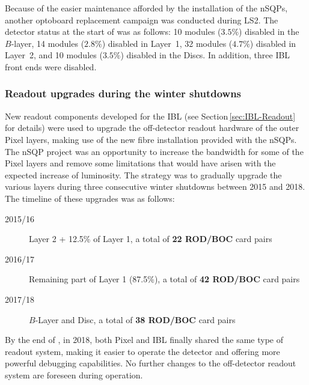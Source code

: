 \documentclass[cernpreprint, atlasdraft=false, UKenglish,british,orcidlogo, texmf, orcidlogo]{atlasdoc}
\begin{document}
Because of the easier maintenance afforded by the installation of the \glspl{nSQP}, another optoboard replacement campaign was conducted during \gls{LS2}. The detector status at the start of \RunThr was as follows: 10 modules ($3.5\%$) disabled in the $B$-layer, 14 modules ($2.8\%$) disabled in Layer~1, 32 modules ($4.7\%$) disabled in Layer~2, and 10 modules ($3.5\%$) disabled in the Discs. In addition, three \gls{IBL} front ends were disabled.
 
 
\subsubsection{Readout upgrades during the winter shutdowns}
\label{sec:Pixel-Readout}
 
New readout components developed for the \gls{IBL} (see Section\,\ref{sec:IBL-Readout} for details) were used to upgrade the off-detector readout hardware of the outer Pixel layers, making use of the new fibre installation provided with the \glspl{nSQP}. The \gls{nSQP} project was an opportunity to increase the bandwidth for some of the Pixel layers and remove some limitations that would have arisen with the expected increase of luminosity.
The strategy was to gradually upgrade the various layers during three consecutive winter shutdowns between 2015 and 2018. The timeline of these upgrades was as follows:
 
\begin{description}
 
\item[2015/16] Layer 2 + 12.5\% of Layer 1, a total of \textbf{22 \gls{ROD}/\gls{BOC}} card pairs
 
\item[2016/17] Remaining part of Layer 1 (87.5\%), a total of \textbf{42 \gls{ROD}/\gls{BOC}} card pairs
 
\item[2017/18] $B$-Layer and Disc, a total of \textbf{38 \gls{ROD}/\gls{BOC}} card pairs
 
\end{description}
 
By the end of \RunTwo, in 2018, both Pixel and \gls{IBL} finally shared the same type of readout system, making it easier to operate the detector and offering more powerful debugging capabilities. No further changes to the off-detector readout system are foreseen during \RunThr operation.

\end{document}
